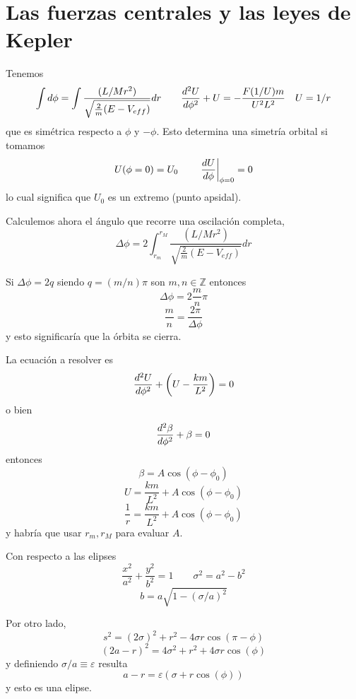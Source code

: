 \documentclass[10pt,oneside]{CBFT_book}
\begin{document}
\section{Las fuerzas centrales y las leyes de Kepler}

Tenemos 
\[
	\int d\phi = \int \frac{(L/Mr^2)}{\sqrt{ \frac{2}{m}(E - V_{eff})}} dr	\qquad
	\dtot[2]{U}{\phi} + U  = - \frac{F(1/U) m}{U^2 L^2} \quad U = 1/r
\]
que es simétrica respecto a $\phi$ y $-\phi$. Esto determina una simetría orbital si
tomamos
\[
	U(\phi=0) = U_0 	\qquad		\left. \dtot{U}{\phi} \right|_{\phi=0}= 0
\]
lo cual significa que $U_0$ es un extremo (punto apsidal).

Calculemos ahora el ángulo que recorre una oscilación completa,
\[
	\Delta \phi = 2\int_{r_m}^{r_M} \frac{(L/Mr^2)}{\sqrt{ \frac{2}{m}(E - V_{eff})}} dr
\]

Si $\Delta \phi = 2 q $ siendo $q= (m/n)\pi $ son $m,n \in \mathbb{Z}$ entonces
\[
	\Delta \phi = 2 \frac{m}{n} \pi 
\]
\[
	\frac{m}{n} = \frac{2\pi}{\Delta \phi}
\]
y esto significaría que la órbita se cierra.

La ecuación a resolver es 
\[
	\dtot[2]{U}{\phi} + \left( U  - \frac{k m}{L^2} \right) = 0
\]
o bien 
\[
	\dtot[2]{\beta}{\phi} + \beta = 0
\]
entonces
\[
	\beta = A \cos( \phi -\phi_0 )
\]
\[
	U = \frac{km}{L^2} +  A \cos( \phi -\phi_0 )
\]
\[
	\frac{1}{r} = \frac{km}{L^2} +  A \cos( \phi -\phi_0 )
\]
y habría que usar $r_m, r_M$ para evaluar $A$.


Con respecto a las elipses
\[
	\frac{x^2}{a^2} + \frac{y^2}{b^2} = 1	\qquad \sigma^2 = a^2 - b^2
\]
\[
	b = a \sqrt{ 1 - (\sigma/a)^2 }
\]

Por otro lado,
\[
	s^2 = (2\sigma)^2 + r^2 - 4\sigma r \cos( \pi - \phi )
\]
\[
	( 2a -r )^2 = 4\sigma^2 + r^2 + 4\sigma r \cos(\phi)
\]
y definiendo $ \sigma/a \equiv \varepsilon$ resulta
\[
	a - r = \varepsilon ( \sigma + r\cos(\phi) )
\]
y esto es una elipse.
\end{document}
